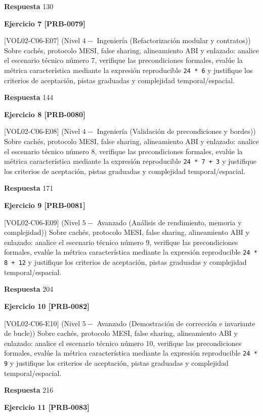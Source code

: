 \documentclass{book}
\begin{document}
\noindent\textbf{Respuesta} 130

\noindent\textbf{Ejercicio 7 [PRB-0079]}

[VOL02-C06-E07] (Nivel \(4 -\) Ingeniería (Refactorización modular y contratos)) Sobre cachés, protocolo MESI, false sharing, alineamiento ABI y enlazado: analice el escenario técnico número 7, verifique las precondiciones formales, evalúe la métrica característica mediante la expresión reproducible \texttt{24 * 6} y justifique los criterios de aceptación, pistas graduadas y complejidad temporal/espacial.

\noindent\textbf{Respuesta} 144

\noindent\textbf{Ejercicio 8 [PRB-0080]}

[VOL02-C06-E08] (Nivel \(4 -\) Ingeniería (Validación de precondiciones y bordes)) Sobre cachés, protocolo MESI, false sharing, alineamiento ABI y enlazado: analice el escenario técnico número 8, verifique las precondiciones formales, evalúe la métrica característica mediante la expresión reproducible \texttt{24 * 7 + 3} y justifique los criterios de aceptación, pistas graduadas y complejidad temporal/espacial.

\noindent\textbf{Respuesta} 171

\noindent\textbf{Ejercicio 9 [PRB-0081]}

[VOL02-C06-E09] (Nivel \(5 -\) Avanzado (Análisis de rendimiento, memoria y complejidad)) Sobre cachés, protocolo MESI, false sharing, alineamiento ABI y enlazado: analice el escenario técnico número 9, verifique las precondiciones formales, evalúe la métrica característica mediante la expresión reproducible \texttt{24 * 8 + 12} y justifique los criterios de aceptación, pistas graduadas y complejidad temporal/espacial.

\noindent\textbf{Respuesta} 204

\noindent\textbf{Ejercicio 10 [PRB-0082]}

[VOL02-C06-E10] (Nivel \(5 -\) Avanzado (Demostración de corrección e invariante de bucle)) Sobre cachés, protocolo MESI, false sharing, alineamiento ABI y enlazado: analice el escenario técnico número 10, verifique las precondiciones formales, evalúe la métrica característica mediante la expresión reproducible \texttt{24 * 9} y justifique los criterios de aceptación, pistas graduadas y complejidad temporal/espacial.

\noindent\textbf{Respuesta} 216

\noindent\textbf{Ejercicio 11 [PRB-0083]}
\end{document}
